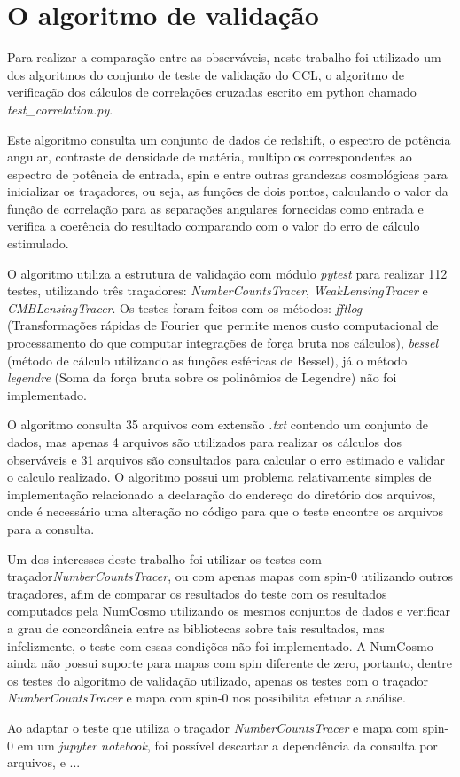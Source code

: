 \section*{O algoritmo de validação}

Para realizar a comparação entre as observáveis, neste trabalho foi utilizado um dos algoritmos do conjunto de teste de validação do CCL, o algoritmo de verificação dos cálculos de correlações cruzadas escrito em python chamado  \textit{test\_correlation.py}.

Este algoritmo consulta um conjunto de dados de redshift, o espectro de potência angular, contraste de densidade de matéria, multipolos correspondentes ao espectro de potência de entrada, spin e entre outras grandezas cosmológicas para inicializar os traçadores, ou seja, as funções de dois pontos, calculando o valor da função de correlação para as separações angulares fornecidas como entrada e verifica a coerência do resultado comparando  com o valor do erro de cálculo estimulado.

O algoritmo utiliza a estrutura de validação com módulo \textit{pytest} para realizar 112 testes, utilizando três traçadores:  \textit{NumberCountsTracer}, \textit{WeakLensingTracer} e \textit{CMBLensingTracer}. Os testes foram feitos com os métodos: \textit{fftlog} (Transformações rápidas de Fourier que permite menos custo computacional de processamento do que computar integrações de força bruta nos cálculos), \textit{bessel} (método de cálculo utilizando as funções esféricas de Bessel), já o método \textit{legendre} (Soma da força bruta sobre os polinômios de Legendre) não foi implementado.

O algoritmo consulta 35 arquivos com extensão \textit{.txt} contendo um conjunto de dados, mas apenas 4 arquivos são utilizados para realizar os cálculos dos observáveis e 31 arquivos são consultados para calcular o erro estimado e validar o calculo realizado. O algoritmo possui um problema relativamente simples de implementação relacionado a declaração do endereço do diretório dos arquivos, onde é necessário uma alteração no código para que o teste encontre os arquivos para a consulta. 

Um dos interesses deste trabalho foi utilizar os testes com traçador\textit{NumberCountsTracer}, ou com apenas mapas com spin-0 utilizando outros traçadores, afim de comparar os resultados do teste com os resultados computados pela NumCosmo utilizando os mesmos conjuntos de dados e verificar a grau de concordância entre as bibliotecas sobre tais resultados, mas infelizmente, o teste com essas condições não foi implementado. A NumCosmo ainda não possui suporte para mapas com spin diferente de zero, portanto, dentre os testes do algoritmo de validação utilizado, apenas os testes com o traçador  \textit{NumberCountsTracer} e mapa com spin-0 nos possibilita efetuar a análise.

Ao adaptar o teste que utiliza o traçador \textit{NumberCountsTracer} e mapa com spin-0 em um \textit{jupyter notebook}, foi possível descartar a dependência da consulta por arquivos, e ...













